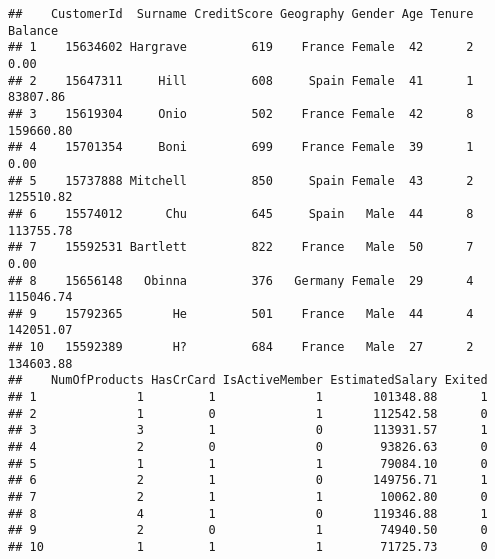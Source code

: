 \documentclass[
]{article}
\newenvironment{Shaded}{\begin{snugshade}}{\end{snugshade}}
\newcommand{\CommentTok}[1]{\textcolor[rgb]{0.56,0.35,0.01}{\textit{#1}}}
\newcommand{\NormalTok}[1]{#1}
\newcommand{\SpecialCharTok}[1]{\textcolor[rgb]{0.81,0.36,0.00}{\textbf{#1}}}
\begin{document}
\begin{verbatim}
##    CustomerId  Surname CreditScore Geography Gender Age Tenure   Balance
## 1    15634602 Hargrave         619    France Female  42      2      0.00
## 2    15647311     Hill         608     Spain Female  41      1  83807.86
## 3    15619304     Onio         502    France Female  42      8 159660.80
## 4    15701354     Boni         699    France Female  39      1      0.00
## 5    15737888 Mitchell         850     Spain Female  43      2 125510.82
## 6    15574012      Chu         645     Spain   Male  44      8 113755.78
## 7    15592531 Bartlett         822    France   Male  50      7      0.00
## 8    15656148   Obinna         376   Germany Female  29      4 115046.74
## 9    15792365       He         501    France   Male  44      4 142051.07
## 10   15592389       H?         684    France   Male  27      2 134603.88
##    NumOfProducts HasCrCard IsActiveMember EstimatedSalary Exited
## 1              1         1              1       101348.88      1
## 2              1         0              1       112542.58      0
## 3              3         1              0       113931.57      1
## 4              2         0              0        93826.63      0
## 5              1         1              1        79084.10      0
## 6              2         1              0       149756.71      1
## 7              2         1              1        10062.80      0
## 8              4         1              0       119346.88      1
## 9              2         0              1        74940.50      0
## 10             1         1              1        71725.73      0
\end{verbatim}

\begin{Shaded}
\end{Shaded}
\end{document}
